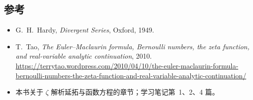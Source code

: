 \documentclass[11pt]{article}
\begin{document}
\begin{samepage}
\section*{参考}
\begin{itemize}
 \item G.\ H.\ Hardy, \emph{Divergent Series}, Oxford, 1949.
 \item T.\ Tao, \emph{The Euler--Maclaurin formula, Bernoulli numbers, the zeta function, and real-variable analytic continuation}, 2010.
 \url{https://terrytao.wordpress.com/2010/04/10/the-euler-maclaurin-formula-bernoulli-numbers-the-zeta-function-and-real-variable-analytic-continuation/}
 \item 本书关于 $\zeta$ 解析延拓与函数方程的章节；学习笔记第~1、2、4 篇。
\end{itemize}
\end{samepage}
\end{document}
